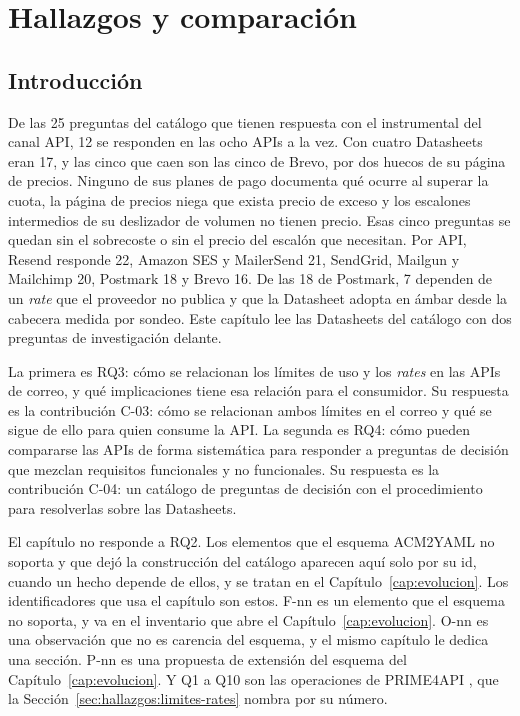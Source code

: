 \chapter{Hallazgos y comparación}
\label{cap:hallazgos}

\section{Introducción}
\label{sec:hallazgos:intro}

De las 25 preguntas del catálogo que tienen respuesta con el
instrumental del canal API, 12 se responden en las ocho APIs a la vez.
Con cuatro Datasheets eran 17, y las cinco que caen son las cinco de
Brevo, por dos huecos de su página de precios. Ninguno de sus planes de
pago documenta qué ocurre al superar la cuota, la página de precios niega
que exista precio de exceso y los escalones intermedios de su deslizador
de volumen no tienen precio. Esas cinco preguntas se quedan sin el
sobrecoste o sin el precio del escalón que necesitan. Por API, Resend responde 22, Amazon SES y MailerSend
21, SendGrid, Mailgun y Mailchimp 20, Postmark 18 y Brevo 16. De las 18
de Postmark, 7 dependen de un \textit{rate} que el proveedor no publica
y que la Datasheet adopta en ámbar desde la cabecera medida por sondeo.
Este capítulo lee las Datasheets del catálogo con dos preguntas de
investigación delante.

La primera es RQ3: cómo se relacionan los límites de uso y los
\textit{rates} en las APIs de correo, y qué implicaciones tiene esa
relación para el consumidor. Su respuesta es la contribución C-03: cómo
se relacionan ambos límites en el correo y qué se sigue de ello para
quien consume la API. La segunda es RQ4: cómo pueden compararse las APIs
de forma sistemática para responder a preguntas de decisión que mezclan
requisitos funcionales y no funcionales. Su respuesta es la contribución
C-04: un catálogo de preguntas de decisión con el procedimiento para
resolverlas sobre las Datasheets.

El capítulo no responde a RQ2. Los elementos que el esquema ACM2YAML no soporta y que
dejó la construcción del catálogo aparecen aquí solo por su id, cuando
un hecho depende de ellos, y se tratan en el
Capítulo~\ref{cap:evolucion}. Los identificadores que usa el capítulo
son estos. F-nn es un elemento que el esquema no soporta, y va en el
inventario que abre el Capítulo~\ref{cap:evolucion}. O-nn es una observación
que no es carencia del esquema, y el mismo capítulo le dedica una sección.
P-nn es una propuesta de extensión del esquema
del Capítulo~\ref{cap:evolucion}. Y Q1 a Q10 son las operaciones de
PRIME4API \citep{gavira2026tfm}, que la
Sección~\ref{sec:hallazgos:limites-rates} nombra por su número.

